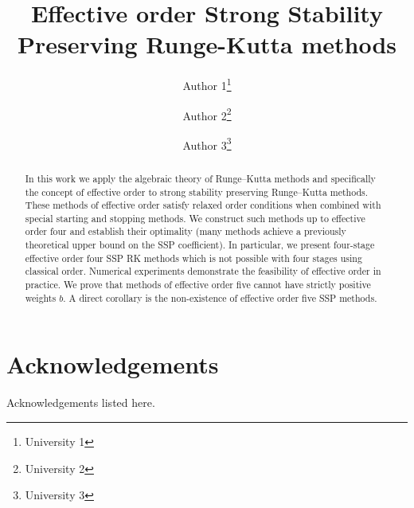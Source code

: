 \documentclass[10pt,a4paper,oneside]{article}
\title{Effective order Strong Stability Preserving Runge-Kutta methods}
\author{Author 1\footnote{University 1}
        \and
        Author 2\footnote{University 2}
        \and
        Author 3\footnote{University 3}}
\numberwithin{equation}{section}
\numberwithin{theorem}{section}
\numberwithin{table}{section}
\begin{document}
\maketitle


\begin{abstract}
  In this work we apply the algebraic theory of Runge--Kutta methods
  and specifically the concept of effective order to strong stability
  preserving Runge--Kutta methods.  These methods of effective order
  satisfy relaxed order conditions when combined with special starting
  and stopping methods.  We construct such methods up to effective
  order four and establish their optimality (many methods achieve a
  previously theoretical upper bound on the SSP coefficient).  In
  particular, we present four-stage effective order four SSP RK
  methods which is not possible with four stages using classical
  order.  Numerical experiments demonstrate the feasibility of
  effective order in practice.  We prove that methods of effective
  order five cannot have strictly positive weights $b$.  A direct
  corollary is the non-existence of effective order five SSP methods.
\end{abstract}




%






\section*{Acknowledgements}
	Acknowledgements listed here.

%


\end{document}
